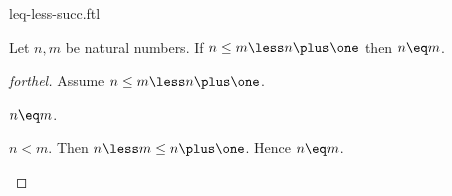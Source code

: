 \documentclass{stex}
\begin{document}
\begin{smodule}{leq-less-succ.ftl}


\begin{proposition}[forthel,id=LeqLessSuccProp]
  Let $n, m$ be natural numbers.
  If $n \leq m \less n \plus \one$ then $n \eq m$.
\end{proposition}
\begin{proof}[forthel]
  Assume $n \leq m \less n \plus \one$.

  \begin{case}{$n \eq m$.} \end{case}

  \begin{case}{$n \less m$.}
    Then $n \less m \leq n \plus \one$.
    Hence $n \eq m$.
  \end{case}
\end{proof}

\end{smodule}
\end{document}
